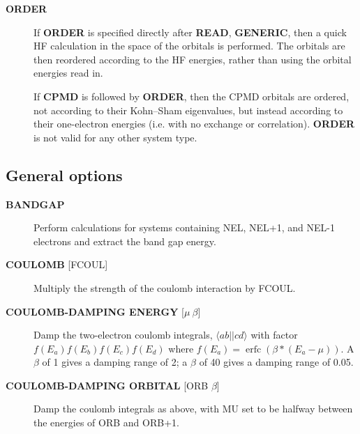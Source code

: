 \documentclass[openany,a4paper,10pt]{manual}
\newcommand{\bra}{\ensuremath{\langle}}
\newcommand{\ket}{\ensuremath{\rangle}}
\begin{document}
\begin{description}
\item[\textbf{ORDER}]
If \textbf{ORDER} is specified directly after \textbf{READ}, \textbf{GENERIC},
then a quick HF calculation in the space of the orbitals is performed.
The orbitals are then reordered according to the HF energies,
rather than using the orbital energies read in.

If \textbf{CPMD} is followed by \textbf{ORDER}, then the CPMD orbitals are
ordered, not according to their Kohn--Sham eigenvalues, but instead
according to their one-electron energies (i.e. with no exchange or
correlation).  \textbf{ORDER} is not valid for any other system type.

\end{description}


\subsection{General options}
\begin{description}
\item[\textbf{BANDGAP}]
Perform calculations for systems containing NEL, NEL+1, and NEL-1
electrons and extract the band gap energy.

\item[\textbf{COULOMB} {[}FCOUL{]}]
Multiply the strength of the coulomb interaction by FCOUL.

\item[\textbf{COULOMB-DAMPING ENERGY} {[}$\mu\ \beta${]}]
Damp the two-electron coulomb integrals, $\bra ab ||
c d\ket$ with factor $f(E_a)f(E_b)f(E_c)f(E_d)$ where
$f(E_a)=\operatorname{erfc}(\beta*(E_a-\mu))$.  A $\beta$
of 1 gives a damping range of 2; a $\beta$ of 40 gives a damping
range of 0.05.

\item[\textbf{COULOMB-DAMPING ORBITAL} {[}ORB $\beta${]}]
Damp the coulomb integrals as above, with MU set to be halfway between
the energies of ORB and ORB+1.

\end{description}
\end{document}
